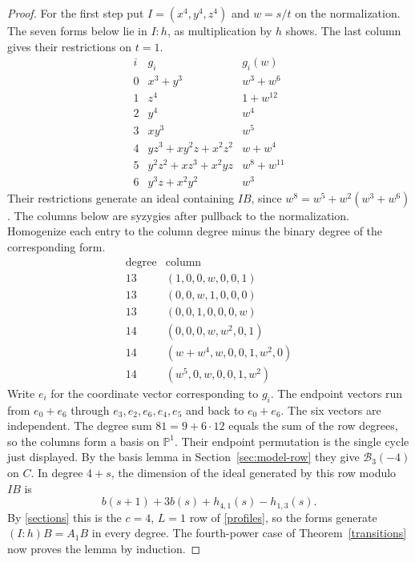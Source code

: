 \documentclass[11pt,a4paper,reqno]{amsart}
\numberwithin{equation}{section}
\theoremstyle{plain}
\newcommand{\PP}{\mathbb P}
\newcommand{\Bcal}{\mathcal B}
\begin{document}
\begin{proof}
For the first step put $I=(x^4,y^4,z^4)$ and $w=s/t$ on the normalization. The seven forms below lie in $I:h$, as multiplication by $h$ shows. The last column gives their restrictions on $t=1$.
\[
\begin{array}{c|l|l}
 i & g_i& g_i(w)\\ \hline
 0&x^3+y^3&w^3+w^6\\
 1&z^4&1+w^{12}\\
 2&y^4&w^4\\
 3&xy^3&w^5\\
 4&yz^3+xy^2z+x^2z^2&w+w^4\\
 5&y^2z^2+xz^3+x^2yz&w^8+w^{11}\\
 6&y^3z+x^2y^2&w^3
\end{array}
\]
Their restrictions generate an ideal containing $IB$, since $w^8=w^5+w^2(w^3+w^6)$. The columns below are syzygies after pullback to the normalization. Homogenize each entry to the column degree minus the binary degree of the corresponding form.
\[
\begin{array}{c|l}
 \text{degree}&\text{column}\\ \hline
 13&(1,0,0,w,0,0,1)\\
 13&(0,0,w,1,0,0,0)\\
 13&(0,0,1,0,0,0,w)\\
 14&(0,0,0,w,w^2,0,1)\\
 14&(w+w^4,w,0,0,1,w^2,0)\\
 14&(w^5,0,w,0,0,1,w^2)
\end{array}
\]
Write $e_i$ for the coordinate vector corresponding to $g_i$. The endpoint vectors run from $e_0+e_6$ through $e_3,e_2,e_6,e_4,e_5$ and back to $e_0+e_6$. The six vectors are independent. The degree sum $81=9+6\cdot12$ equals the sum of the row degrees, so the columns form a basis on $\PP^1$. Their endpoint permutation is the single cycle just displayed. By the basis lemma in Section~\ref{sec:model-row} they give $\Bcal_3(-4)$ on $C$. In degree $4+s$, the dimension of the ideal generated by this row modulo $IB$ is
\[
 b(s+1)+3b(s)+h_{4,1}(s)-h_{1,3}(s).
\]
By \eqref{sections} this is the $c=4$, $L=1$ row of \eqref{profiles}, so the forms generate $(I:h)B=A_1B$ in every degree. The fourth-power case of Theorem~\ref{transitions} now proves the lemma by induction.
\end{proof}
\end{document}
